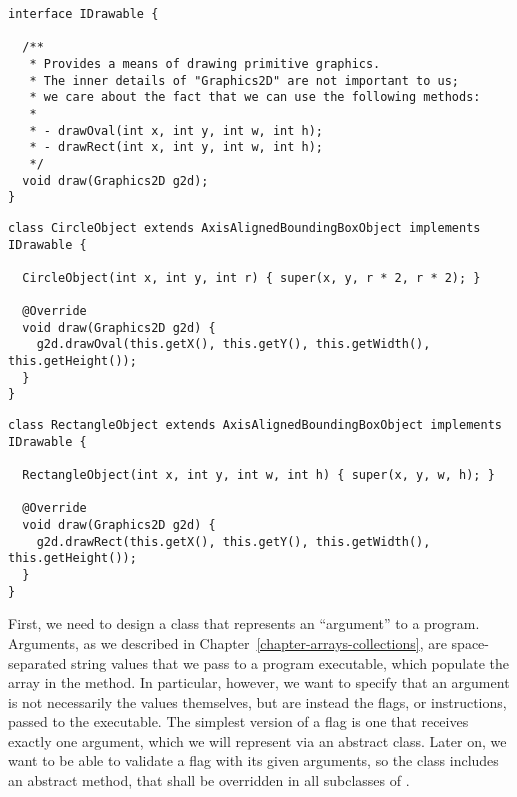 \begin{lstlisting}[language=MyJava]
interface IDrawable {
  
  /**
   * Provides a means of drawing primitive graphics.
   * The inner details of "Graphics2D" are not important to us; 
   * we care about the fact that we can use the following methods:
   * 
   * - drawOval(int x, int y, int w, int h);
   * - drawRect(int x, int y, int w, int h);
   */
  void draw(Graphics2D g2d); 
}
\end{lstlisting} 

\begin{lstlisting}[language=MyJava]
class CircleObject extends AxisAlignedBoundingBoxObject implements IDrawable {
  
  CircleObject(int x, int y, int r) { super(x, y, r * 2, r * 2); }

  @Override
  void draw(Graphics2D g2d) {
    g2d.drawOval(this.getX(), this.getY(), this.getWidth(), this.getHeight());
  }
}
\end{lstlisting}

\begin{lstlisting}[language=MyJava]
class RectangleObject extends AxisAlignedBoundingBoxObject implements IDrawable {
  
  RectangleObject(int x, int y, int w, int h) { super(x, y, w, h); }
  
  @Override
  void draw(Graphics2D g2d) {
    g2d.drawRect(this.getX(), this.getY(), this.getWidth(), this.getHeight());
  }
}
\end{lstlisting}


First, we need to design a class that represents an ``argument'' to a program. Arguments, as we described in Chapter~\ref{chapter-arrays-collections}, are space-separated string values that we pass to a program executable, which populate the  array in the  method. In particular, however, we want to specify that an argument is not necessarily the values themselves, but are instead the flags, or instructions, passed to the executable. The simplest version of a flag is one that receives exactly one argument, which we will represent via an abstract  class. Later on, we want to be able to validate a flag with its given arguments, so the  class includes an abstract  method, that shall be overridden in all subclasses of .


